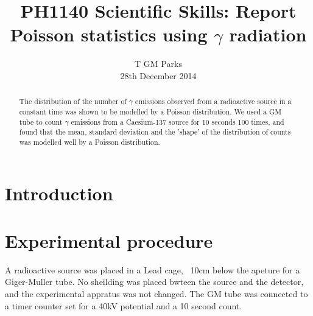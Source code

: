 \documentclass[10pt]{iopart}
\begin{document}
\title[PH1140 Report - T GM Parks]{PH1140 Scientific Skills: Report Poisson statistics using $\gamma$ radiation}

\author{T GM Parks\\28th December 2014}

\begin{abstract}
The distribution of the number of $\gamma$ emissions observed from a radioactive source in a constant time was shown to be modelled by a Poisson distribution. We used a GM tube to count $\gamma$ emissions from a Caesium-137 source for 10 seconds 100 times, and found that the mean, standard deviation and the 'shape' of the distribution of counts was modelled well by a Poisson distribution.
\end{abstract}


\section{Introduction}

\section{Experimental procedure}

A radioactive source was placed in a Lead cage, ~10cm below the apeture for a Giger-Muller tube. No sheilding was placed bwteen the source and the detector, and the experimental appratus was not changed. The GM tube was connected to a timer counter set for a 40kV potential and a 10 second count.
\end{document}
